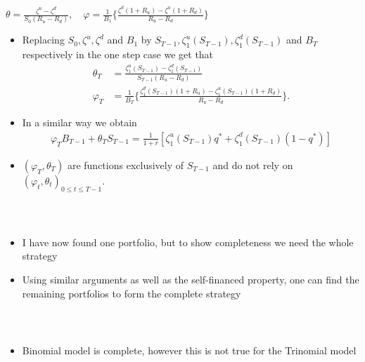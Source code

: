 \documentclass{beamer}
\numberwithin{equation}{section}
\begin{document}
\begin{frame}\frametitle{{\normalsize \secname} \\ {\large \subsecname}}
    \begin{center}
    $\theta = \frac{\zeta^u - \zeta^d}{S_0 (R_u - R_d)}, \quad \varphi = \frac{1}{B_1} \bigg\{ \frac{\zeta^d(1+R_u) - \zeta^u(1+R_d)}{R_u - R_d} \bigg\}$
    \end{center}
    \begin{itemize}
        \item Replacing $S_0, \zeta^u, \zeta^d$ and $B_1$ by $S_{T-1}, \zeta_1^u(S_{T-1}), \zeta_1^d(S_{T-1})$ and $B_T$ respectively in the one step case we get that
        \begin{align*}
            \theta_T&= \frac{\zeta^u_1 (S_{T-1}) - \zeta_1^d (S_{T-1})}{S_{T-1}(R_u - R_d)}\\
            \varphi_T &= \frac{1}{B_T} \Bigg\{  \frac{\zeta_1^d (S_{T-1})  (1+R_u) - \zeta_1^u (S_{T-1}) (1+R_d)}{R_u - R_d} \Bigg\}.
        \end{align*}
                \item In a similar way we obtain
        \begin{align*}
            \varphi_T B_{T-1} + \theta_T S_{T-1} = \frac{1}{1+r} \left[ \zeta_1^u(S_{T-1})q^* + \zeta_1^d(S_{T-1})(1 - q^*) \right]
        \end{align*}
        \item $(\varphi_T, \theta_T)$ are functions exclusively of $S_{T-1}$ and do not rely on $(\varphi_t, \theta_t)_{0 \leq t \leq T-1}$.
    \end{itemize}
\end{frame}

\begin{frame}\frametitle{{\normalsize \secname} \\ {\large \subsecname}}
    \begin{itemize}
        \item I have now found one portfolio, but to show completeness we need the whole strategy
        \item Using similar arguments as well as the self-financed property, one can find the remaining portfolios to form the complete strategy
    \end{itemize}
\end{frame}

\begin{frame}\frametitle{{\normalsize \secname} \\ {\large \subsecname}}
    \begin{itemize}
        \item Binomial model is complete, however this is not true for the Trinomial model
        \vspace{6cm}
    \end{itemize}
\end{frame}
\end{document}
